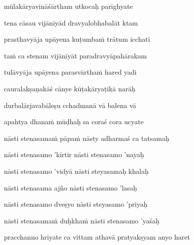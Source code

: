 mūlakāryavināśārtham utkocaḥ parighyate\thinspace{\dandab} \dontdisplaylinenum

tena cāsau vijānīyād dravyalobhabalāt ktam \veg\dontdisplaylinenum

prasthavyāja upāyena kuṭumba\.m trātum icchati\thinspace{\dandab} \dontdisplaylinenum

ta\.m ca stenam vijānīyāt paradravyāpahārakam \veg\dontdisplaylinenum

tulāvyāja upāyena parasvārtha\.m hared yadi\thinspace{\dandab} \dontdisplaylinenum

cauralakṣaṇakāś cānye kūṭakāryaṭikā narāḥ \veg\dontdisplaylinenum

durbalārjavabāleṣu cchadmanā vā balena vā\thinspace{\dandab} \dontdisplaylinenum

apahtya dhana\.m mūḍhaḥ sa coraś cora ucyate \veg\dontdisplaylinenum

nāsti stenasama\.m pāpa\.m nāsty adharmaś ca tatsamaḥ\thinspace{\dandab} \dontdisplaylinenum
            \var{\vo \om\ \Ed}%

nāsti stenasamo 'kīrtir nāsti stenasamo 'nayaḥ \veg\dontdisplaylinenum

nāsti stenasamo 'vidyā nāsti steyasamaḥ khalaḥ\thinspace{\dandab} \dontdisplaylinenum

nāsti stenasama ajño nāsti stenasamo 'lasaḥ \veg\dontdisplaylinenum

nāsti stenasamo dveṣyo nāsti steyasamo 'priyaḥ\thinspace{\dandab} \dontdisplaylinenum

nāsti stenasama\.m duḥkha\.m nāsti stenasamo 'yaśaḥ \veg\dontdisplaylinenum

\ujvers\nemsloka 
pracchanno hriyate ca vittam athavā pratyakṣyam anyo haret
\dontdisplaylinenum

